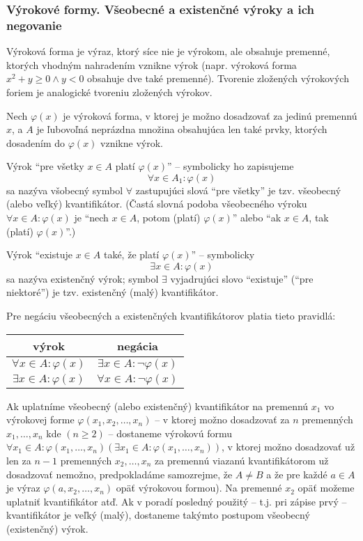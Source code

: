 \subsubsection*{Výrokové formy. Všeobecné a existenčné výroky a ich negovanie}

Výroková forma je výraz, ktorý síce nie je výrokom, ale obsahuje premenné,
ktorých vhodným nahradením vznikne výrok (napr. výroková forma $x^2 + y \geq 0
\land y < 0$ obsahuje dve také premenné). Tvorenie zložených výrokových foriem
je analogické tvoreniu zložených výrokov.

Nech $\varphi (x)$ je výroková forma, v ktorej je možno dosadzovať za jedinú
premennú $x$, a $A$ je ľubovoľná neprázdna množina obsahujúca len také prvky,
ktorých dosadením do $\varphi (x)$ vznikne výrok.

Výrok \enquote{pre všetky $x \in A$ platí $\varphi (x)$} -- symbolicky ho
zapisujeme
\[
  \forall x \in A_1: \varphi (x)
\]
sa nazýva všobecný symbol $\forall$ zastupujúci slová \enquote{pre všetky} je
tzv. všeobecný (alebo veľký) kvantifikátor. (Častá slovná podoba všeobecného
výroku $\forall x \in A : \varphi (x)$ je \enquote{nech $x \in A$, potom
(platí) $\varphi (x)$} alebo \enquote{ak $x \in A$, tak (platí) $\varphi
(x)$}.)

Výrok \enquote{existuje $x \in A$ také, že platí $\varphi (x)$} -- symbolicky
\[
  \exists x \in A : \varphi (x)
\]
sa nazýva existenčný výrok; symbol $\exists$ vyjadrujúci slovo
\enquote{existuje} (\enquote{pre niektoré}) je tzv. existenčný (malý)
kvantifikátor.

Pre negáciu všeobecných a existenčných kvantifikátorov platia tieto pravidlá:
\begin{center}
  \begin{tabular}{c | c}
    výrok & negácia \\
    \hline
    $\forall x \in A : \varphi (x)$ & $\exists x \in A : \neg \varphi (x)$ \\
    $\exists x \in A : \varphi (x)$ & $\forall x \in A : \neg \varphi (x)$ \\
  \end{tabular}
\end{center}

Ak uplatníme všeobecný (alebo existenčný) kvantifikátor na premennú $x_1$ vo
výrokovej forme $\varphi(x_1, x_2, \ldots, x_n)$ -- v ktorej možno dosadzovať za
$n$ premenných $x_1, \ldots, x_n$ kde $(n \geq 2)$ -- dostaneme výrokovú formu
$\forall x_1 \in A: \varphi (x_1, \ldots, x_n) (\exists x_1 \in A: \varphi
(x_1, \ldots, x_n))$, v ktorej možno dosadzovať už len za $n - 1$ premenných
$x_2, \ldots, x_n$ za premennú viazanú kvantifikátorom už dosadzovať nemožno,
predpokladáme samozrejme, že $A \neq B$ a že pre každé $a \in A$ je výraz
$\varphi (a, x_2, \ldots, x_n)$ opäť výrokovou formou). Na premenné $x_2$ opäť
možeme uplatniť kvantifikátor atď. Ak v poradí posledný použitý -- t.j. pri
zápise prvý -- kvantifikátor je veľký (malý), dostaneme takýmto postupom
všeobecný (existenčný) výrok.


